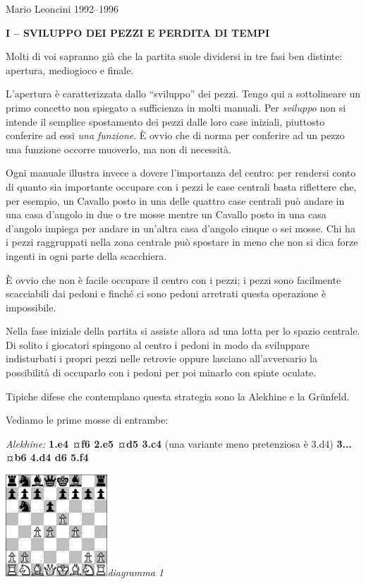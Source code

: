 \documentclass[
]{article}
\begin{document}
Mario Leoncini 1992--1996

\textbf{I -- SVILUPPO DEI PEZZI E PERDITA DI TEMPI}

Molti di voi sapranno già che la partita suole dividersi in tre fasi ben
distinte: apertura, mediogioco e finale.

L'apertura è caratterizzata dallo ``sviluppo'' dei pezzi. Tengo qui a
sottolineare un primo concetto non spiegato a sufficienza in molti
manuali. Per \emph{sviluppo} non si intende il semplice spostamento dei
pezzi dalle loro case iniziali, piuttosto conferire ad essi \emph{una
funzione}. È ovvio che di norma per conferire ad un pezzo una funzione
occorre muoverlo, ma non di necessità.

Ogni manuale illustra invece a dovere l'importanza del centro: per
rendersi conto di quanto sia importante occupare con i pezzi le case
centrali basta riflettere che, per esempio, un Cavallo posto in una
delle quattro case centrali può andare in una casa d'angolo in due o tre
mosse mentre un Cavallo posto in una casa d'angolo impiega per andare in
un'altra casa d'angolo cinque o sei mosse. Chi ha i pezzi raggruppati
nella zona centrale può spostare in meno che non si dica forze ingenti
in ogni parte della scacchiera.

È ovvio che non è facile occupare il centro con i pezzi; i pezzi sono
facilmente scacciabili dai pedoni e finché ci sono pedoni arretrati
questa operazione è impossibile.

Nella fase iniziale della partita si assiste allora ad una lotta per lo
spazio centrale. Di solito i giocatori spingono al centro i pedoni in
modo da sviluppare indisturbati i propri pezzi nelle retrovie oppure
lasciano all'avversario la possibilità di occuparlo con i pedoni per poi
minarlo con spinte oculate.

Tipiche difese che contemplano questa strategia sono la Alekhine e la
Grünfeld.

Vediamo le prime mosse di entrambe:

\emph{Alekhine:} \textbf{1.e4 ¤f6 2.e5 ¤d5 3.c4} (una variante meno
pretenziosa è 3.d4) \textbf{3... ¤b6 4.d4 d6 5.f4}

\includegraphics[width=1.50417in,height=1.50417in]{vertopal_109f12be458a423d8f3cc838880eaea2/media/image1.png}\emph{diagramma
1}
\end{document}
